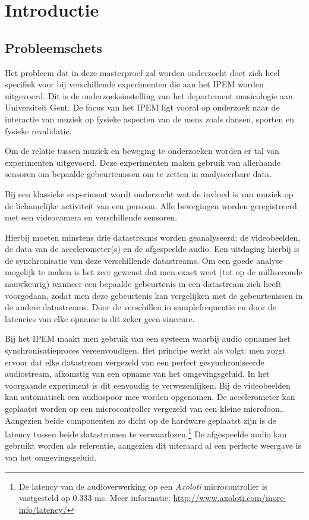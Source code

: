 \chapter{Introductie}

\section{Probleemschets}
\label{probleemschets}

Het probleem dat in deze masterproef zal worden onderzocht doet zich heel specifiek voor bij verschillende experimenten die aan het IPEM worden uitgevoerd. Dit is de onderzoeksinstelling van het departement musicologie aan Universiteit Gent. De focus van het IPEM ligt vooral op onderzoek naar de interactie van muziek op fysieke aspecten van de mens zoals dansen, sporten en fysieke revalidatie. \cite{ipem2016}

Om de relatie tussen muziek en beweging te onderzoeken worden er tal van experimenten uitgevoerd. Deze experimenten maken gebruik van allerhande sensoren om bepaalde gebeurtenissen om te zetten in analyseerbare data. 

Bij een klassieke experiment wordt onderzocht wat de invloed is van muziek op de lichamelijke activiteit van een persoon. Alle bewegingen worden geregistreerd met een videocamera en verschillende sensoren.

Hierbij moeten minstens drie datastreams worden geanalyseerd: de videobeelden, de data van de accelerometer(s) en de afgespeelde audio. Een  uitdaging hierbij is de synchronisatie van deze verschillende datastreams. Om een goede analyse mogelijk te maken is het zeer gewenst dat men exact weet (tot op de milliseconde nauwkeurig) wanneer een bepaalde gebeurtenis in een datastream zich heeft voorgedaan, zodat men deze gebeurtenis kan vergelijken met de gebeurtenissen in de andere datastreams. Door de verschillen in samplefrequentie en door de latencies van elke opname is dit zeker geen sinecure. \cite{six2015multimodal}

Bij het IPEM maakt men gebruik van een systeem waarbij audio opnames het synchronisatieproces vereenvoudigen. Het principe werkt als volgt: men zorgt ervoor dat elke datastream vergezeld van een perfect gesynchroniseerde audiostream, afkomstig van een opname van het omgevingsgeluid. In het voorgaande experiment is dit eenvoudig te verwezenlijken. Bij de videobeelden kan automatisch een audiospoor mee worden opgenomen. De accelerometer kan geplaatst worden op een microcontroller vergezeld van een kleine microfoon.. Aangezien beide componenten zo dicht op de hardware geplaatst zijn is de latency tussen beide datastromen te verwaarlozen.\footnote{De latency van de audioverwerking op een \textit{Axoloti} microcontroller is vastgesteld op 0.333 ms. Meer informatie: \url{http://www.axoloti.com/more-info/latency/}} De afgespeelde audio kan gebruikt worden als referentie, aangezien dit uiteraard al een perfecte weergave is van het omgevingsgeluid. 

